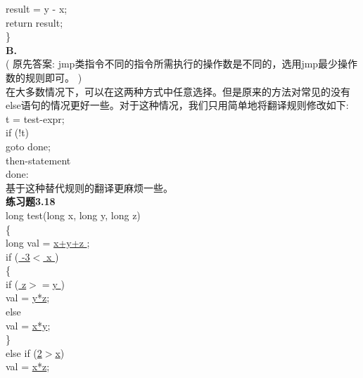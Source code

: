\documentclass{article}
\begin{document}
\begin{CJK}{UTF8}{uyhei}
	\hspace*{2em}	result = y - x;		\\
	\hspace*{2em}	return result;		\\
\}	\\[1ex]
\textbf{B.}	\\
( 原先答案: jmp类指令不同的指令所需执行的操作数是不同的，选用jmp最少操作数的规则即可。 )	\\
在大多数情况下，可以在这两种方式中任意选择。但是原来的方法对常见的没有else语句的情况更好一些。对于这种情况，我们只用简单地将翻译规则修改如下:	\\
	\hspace*{2em}	t = test-expr;		\\
	\hspace*{2em}	if (!t)			\\
	\hspace*{4em}		goto done;	\\
	\hspace*{2em}	then-statement		\\
	\hspace*{1em} done:			\\
	基于这种替代规则的翻译更麻烦一些。		\\[3ex]
\textbf{练习题3.18}	\\
long test(long x, long y, long z)	\\
\{					\\
	\hspace*{2em}	long val = \underline{ x+y+z };	\\
	\hspace*{2em}	if (\underline{ -3$<$ x })		\\
	\hspace*{2em}	\{	\\
	\hspace*{4em}		if (\underline{ z$>=$y })	\\
	\hspace*{6em}			val = \underline{y*z};	\\
	\hspace*{4em}		else	\\
	\hspace*{6em}			val = \underline{x*y};	\\
	\hspace*{2em}	\}	\\
	\hspace*{2em}	else if (\underline{2$>$x})			\\
	\hspace*{4em}		val = \underline{x*z};		\\

\end{CJK}
\end{document}
